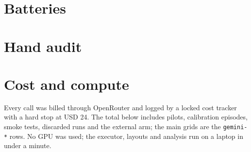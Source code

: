 \FloatBarrier
\section{Batteries}
\label{app:batteries}


\FloatBarrier
\section{Hand audit}
\label{app:audit}

\begin{table}[t]
\centering\small
\resizebox{\columnwidth}{!}{}
\caption{Hand-coded wrong trap answers by layout. The per-item codes and notes ship in \texttt{results/audit\_sample.json}.}
\label{tab:audit}
\end{table}

\FloatBarrier
\section{Cost and compute}
\label{app:cost}
Every call was billed through OpenRouter and logged by a locked cost tracker with a hard stop at USD 24. The total below includes pilots, calibration episodes, smoke tests, discarded runs and the external arm; the main grids are the \texttt{gemini-*} rows. No GPU was used; the executor, layouts and analysis run on a laptop in under a minute.
\begin{table}[t]
\centering\small
\resizebox{\columnwidth}{!}{}
\caption{Metered spend by model and arm (USD, OpenRouter \texttt{usage.cost}).}
\label{tab:cost}
\end{table}
